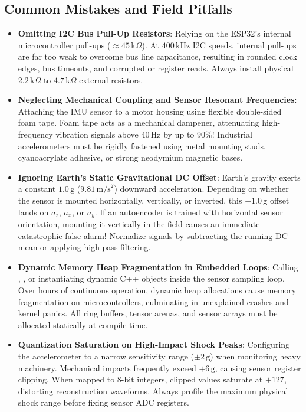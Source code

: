 \subsection{Common Mistakes and Field Pitfalls}\label{subsec:p3_pitfalls}

\begin{warning}
\begin{itemize}
    \item \textbf{Omitting I2C Bus Pull-Up Resistors}:
    Relying on the ESP32's internal microcontroller pull-ups ($\approx 45\,\text{k}\Omega$). At $400\,\text{kHz}$ I2C speeds, internal pull-ups are far too weak to overcome bus line capacitance, resulting in rounded clock edges, bus timeouts, and corrupted  or  register reads. Always install physical $2.2\,\text{k}\Omega$ to $4.7\,\text{k}\Omega$ external resistors.
    \item \textbf{Neglecting Mechanical Coupling and Sensor Resonant Frequencies}:
    Attaching the IMU sensor to a motor housing using flexible double-sided foam tape. Foam tape acts as a mechanical dampener, attenuating high-frequency vibration signals above $40\,\text{Hz}$ by up to $90\%$! Industrial accelerometers must be rigidly fastened using metal mounting studs, cyanoacrylate adhesive, or strong neodymium magnetic bases.
    \item \textbf{Ignoring Earth's Static Gravitational DC Offset}:
    Earth's gravity exerts a constant $1.0\,\text{g}$ ($9.81\,\text{m/s}^2$) downward acceleration. Depending on whether the sensor is mounted horizontally, vertically, or inverted, this $+1.0\,\text{g}$ offset lands on $a_z$, $a_x$, or $a_y$. If an autoencoder is trained with horizontal sensor orientation, mounting it vertically in the field causes an immediate catastrophic false alarm! Normalize signals by subtracting the running DC mean or applying high-pass filtering.
    \item \textbf{Dynamic Memory Heap Fragmentation in Embedded Loops}:
    Calling , , or instantiating dynamic C++  objects inside the sensor sampling loop. Over hours of continuous operation, dynamic heap allocations cause memory fragmentation on microcontrollers, culminating in unexplained crashes and kernel panics. All ring buffers, tensor arenas, and sensor arrays must be allocated statically at compile time.
    \item \textbf{Quantization Saturation on High-Impact Shock Peaks}:
    Configuring the accelerometer to a narrow sensitivity range ($\pm 2\,\text{g}$) when monitoring heavy machinery. Mechanical impacts frequently exceed $+6\,\text{g}$, causing sensor register clipping. When mapped to 8-bit integers, clipped values saturate at $+127$, distorting reconstruction waveforms. Always profile the maximum physical shock range before fixing sensor ADC registers.
\end{itemize}
\end{warning}

